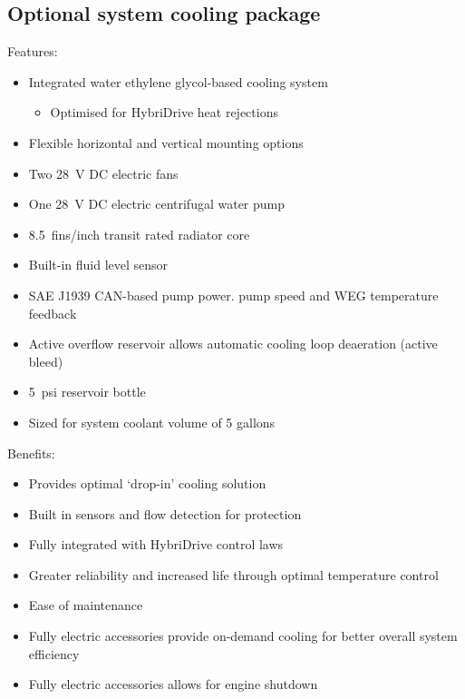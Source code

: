 \subsection{Optional system cooling package}
Features:
\begin{itemize}
    \item Integrated water ethylene glycol-based cooling system
          \begin{itemize}
              \item Optimised for HybriDrive heat rejections
          \end{itemize}
    \item Flexible horizontal and vertical mounting options
    \item Two \SI{28}{\volt} DC electric fans
    \item One \SI{28}{\volt} DC electric centrifugal water pump
    \item \SI{8.5}{fins/inch} transit rated radiator core
    \item Built-in fluid level sensor
    \item SAE J1939 CAN-based pump power. pump speed and WEG temperature feedback
    \item Active overflow reservoir allows automatic cooling loop deaeration (active bleed)
    \item \SI{5}{psi} reservoir bottle
    \item Sized for system coolant volume of 5 gallons
\end{itemize}
Benefits:
\begin{itemize}
    \item Provides optimal `drop-in' cooling solution
    \item Built in sensors and flow detection for protection
    \item Fully integrated with HybriDrive control laws
    \item Greater reliability and increased life through optimal temperature control
    \item Ease of maintenance
    \item Fully electric accessories provide on-demand cooling for better overall system efficiency
    \item Fully electric accessories allows for engine shutdown
\end{itemize}

